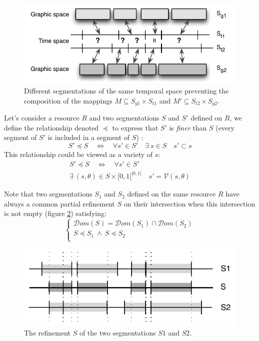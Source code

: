 \documentclass[letterpaper, 12pt]{article}
\newcommand{\raff}				{\ensuremath{\preccurlyeq}}
\newcommand{\domaine}			{{\mathcal Dom}}
\newcommand{\variete}			{\ensuremath{\mathcal{V}}}
\newcommand{\fvariete}		{\ensuremath{[0,1[^{[0,1[}}}
\begin{document}
\begin{figure} %
\begin{center}
	\includegraphics[width=0.9\baseimgwidth]{imgs/composition3}
\caption{Different segmentations of the same temporal space preventing the composition of the mappings $M \subseteq S_{g1} \times S_{t1}$ and $M' \subseteq S_{t2} \times S_{g2}$.}
\label{fig:compo}
\end{center}
\end{figure}


Let's consider a resource $R$ and two segmentations $S$ and $S'$ defined on $R$, we define the relationship denoted $\raff$ to express that $S'$
is \emph{finer} than $S$ (every segment of $S'$ is included in a segment of $S$) :
$$ S' \raff S \quad  \Leftrightarrow  \quad \forall s' \in S' \quad \exists\ s \in S \quad s' \subset s $$
This relationship could be viewed as a variety of $s$:
\begin{align}
 S' \raff S \quad  \Leftrightarrow  \quad \forall s' \in S' \nonumber \\
 \exists\ (s,\theta) \in S \times \fvariete  \quad s' =\variete(s,\theta)
\end{align}

Note that two segmentations $S_1$ and $S_2$ defined on the same resource $R$ have always a common partial refinement $S$ on their intersection when this intersection is not empty (figure \ref{fig:isegm}) satisfying:
\[
\begin{cases}
\domaine(S) = \domaine(S_1) \cap \domaine(S_2) \\
S \raff S_1\ \land\ S \raff S_2 \\
\end{cases}
\]

\begin{figure} %
\begin{center}
	\psfrag{S}{$S \raff S_1\ \land\ S \raff S_2$}
	\includegraphics[width=0.9\baseimgwidth]{imgs/segintersect}
\caption{The refinement $S$ of the two segmentations $S1$ and $S2$.}
\label{fig:isegm}
\end{center}
\end{figure}
\end{document}
